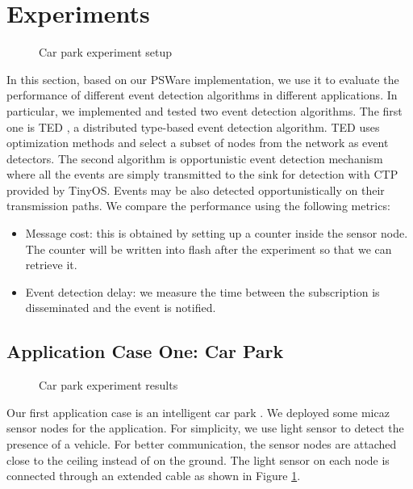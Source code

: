 \section{Experiments}
\label{sec:experiments}
\begin{figure}
\centering
{}
\qquad
{}
\caption{Car park experiment setup}
\label{fig:carParkSensor}
\end{figure}

In this section, based on our PSWare implementation, we use it to evaluate the performance of different event detection algorithms in different applications. In particular, we implemented and tested two event detection algorithms. The first one is TED \cite{lai:ted}, a distributed type-based event detection algorithm. TED uses optimization methods and select a subset of nodes from the network as event detectors. The second algorithm is opportunistic event detection mechanism where all the events are simply transmitted to the sink for detection with CTP \cite{ctp} provided by TinyOS. Events may be also detected opportunistically on their transmission paths. We compare the performance using the following metrics:
\begin{itemize}
\item Message cost: this is obtained by setting up a counter inside the sensor node. The counter will be written into flash after the experiment so that we can retrieve it.
\item Event detection delay: we measure the time between the subscription is disseminated and the event is notified.
\end{itemize}


\subsection{Application Case One: Car Park}
\begin{figure}
\centering
{}
\caption{Car park experiment results}
\label{fig:carParkResults}
\end{figure}
Our first application case is an intelligent car park \cite{tang:carpark}. We deployed some micaz sensor nodes for the application. For simplicity, we use light sensor to detect the presence of a vehicle. For better communication, the sensor nodes are attached close to the ceiling instead of on the ground. The light sensor on each node is connected through an extended cable as shown in Figure \ref{fig:carParkSensor}. 

